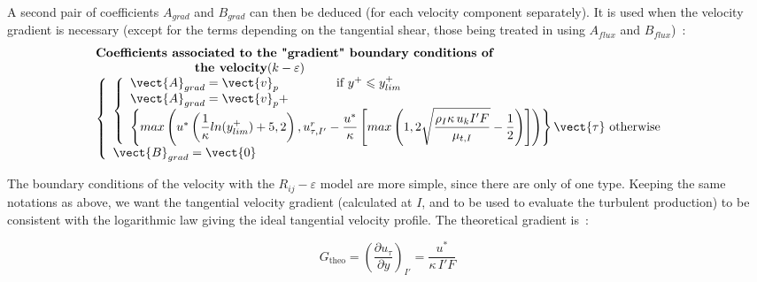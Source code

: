 A second pair of coefficients $A_{grad}$ and $B_{grad}$ can then be deduced
(for each velocity component separately). It is used when the velocity
gradient is necessary (except for the terms depending on the tangential shear,
those being treated in  using $A_{flux}$ and $B_{flux}$)~:
\begin{equation}
\begin{array}{l}
\text{\bf Coefficients associated to the "gradient" boundary conditions of }\\
\qquad\qquad\qquad\qquad\text{\bf the velocity}  (k-\varepsilon)\\
\left\{\begin{array}{l}
\left\{\begin{array}{l}
\vect{A}_{grad}=\vect{v}_p
                    \qquad\qquad\text{ \ if\ } y^+\leqslant y^+_{lim} \\
\vect{A}_{grad}=\vect{v}_p+\\
\left\{
max\left(u^*\left(\displaystyle\frac{1}{\kappa}ln(y^+_{lim})+5,2\right),
u^r_{\tau,I'}-\displaystyle\frac{u^*}{\kappa}\left[max\left(1,
2\sqrt{\displaystyle\frac{\rho_I\kappa\, u_k I'F}{\mu_{t,I}}
}-\displaystyle\frac{1}{2}\right)\right]\right)
\right\}\vect{\tau}
    \text{ otherwise }
\end{array}\right.  \\
\vect{B}_{grad} = \vect{0}
\end{array}\right.
\end{array}
\end{equation}


The boundary conditions of the velocity with the  $R_{ij}-\varepsilon$ model are
more simple, since there are only of one type.
Keeping the same notations as above, we want the tangential velocity gradient
(calculated at $I$, and to be used to evaluate the turbulent production)
to be consistent with the logarithmic law giving the ideal tangential
velocity profile. The theoretical gradient is~:

\begin{equation}\label{Base_Clptur_eq_grad_theo_clptur}
G_{\text{theo}} = \left(\displaystyle\frac{\partial u_\tau}{\partial y}\right)_{I'}=\frac{u^*}{\kappa\, I'F}
\end{equation}

